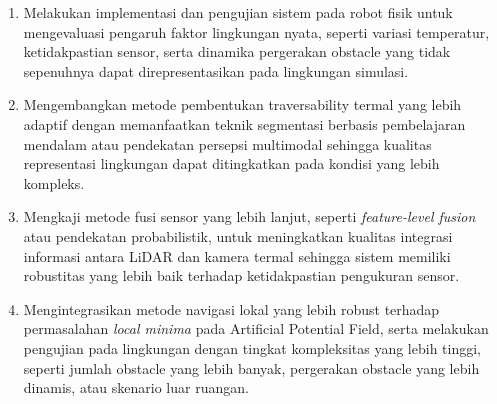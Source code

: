 \begin{enumerate}

\item Melakukan implementasi dan pengujian sistem pada robot fisik untuk mengevaluasi pengaruh faktor lingkungan nyata, seperti variasi temperatur, ketidakpastian sensor, serta dinamika pergerakan obstacle yang tidak sepenuhnya dapat direpresentasikan pada lingkungan simulasi.

\item Mengembangkan metode pembentukan traversability termal yang lebih adaptif dengan memanfaatkan teknik segmentasi berbasis pembelajaran mendalam atau pendekatan per\-sepsi multimodal sehingga kualitas representasi lingkungan dapat ditingkatkan pada kondisi yang lebih kompleks.

\item Mengkaji metode fusi sensor yang lebih lanjut, seperti \textit{feature-level fusion} atau pendekatan probabilistik, untuk meningkatkan kualitas integrasi informasi antara LiDAR dan kamera termal sehingga sistem memiliki robustitas yang lebih baik terhadap ketidakpastian pengukuran sensor.

\item Mengintegrasikan metode navigasi lokal yang lebih robust terhadap permasalahan \textit{local minima} pada Artificial Potential Field, serta melakukan pengujian pada lingkungan dengan tingkat kompleksitas yang lebih tinggi, seperti jumlah obstacle yang lebih banyak, pergerakan obstacle yang lebih dinamis, atau skenario luar ruangan.

\end{enumerate}